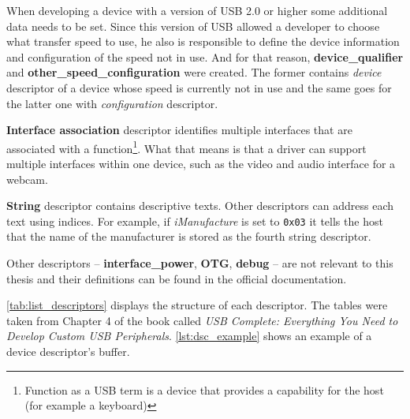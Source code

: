 When developing a device with a version of USB 2.0 or higher some additional data needs to be set. Since this version of USB allowed a developer to choose what transfer speed to use, he also is responsible to define the device information and configuration of the speed not in use. And for that reason, \textbf{device\_qualifier} and \textbf{other\_speed\_configuration} were created. The former contains \emph{device} descriptor of a device whose speed is currently not in use and the same goes for the latter one with \emph{configuration} descriptor.

\textbf{Interface association} descriptor identifies multiple interfaces that are associated with a function\footnote{Function as a USB term is a device that provides a capability for the host (for example a keyboard)}. What that means is that a driver can support multiple interfaces within one device, such as the video and audio interface for a webcam.

\textbf{String} descriptor contains descriptive texts. Other descriptors can address each text using indices. For example, if \emph{iManufacture} is set to \verb|0x03| it tells the host that the name of the manufacturer is stored as the fourth string descriptor.

Other descriptors \--- \textbf{interface\_power}, \textbf{OTG}, \textbf{debug} \--- are not relevant to this thesis and their definitions can be found in the official documentation.

\autoref{tab:list_descriptors} displays the structure of each descriptor. The tables were taken from Chapter 4 of the book called \emph{USB Complete: Everything You Need to Develop Custom USB Peripherals}. \autoref{lst:dsc_example} shows an example of a device descriptor's buffer.

